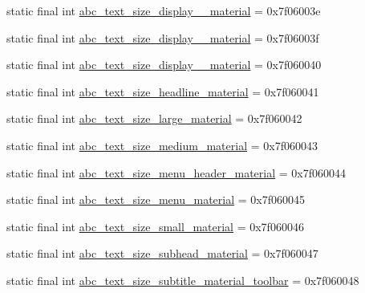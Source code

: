 \begin{DoxyCompactItemize}
\item 
static final int \mbox{\hyperlink{classandroid_1_1support_1_1v7_1_1appcompat_1_1_r_1_1dimen_a7b93df89a088e5eb5c60634410dd3025}{abc\+\_\+text\+\_\+size\+\_\+display\+\_\+\_\+material}} = 0x7f06003e
\item 
static final int \mbox{\hyperlink{classandroid_1_1support_1_1v7_1_1appcompat_1_1_r_1_1dimen_ae98219f74eec556bfe8abdeab1d68bba}{abc\+\_\+text\+\_\+size\+\_\+display\+\_\+\_\+material}} = 0x7f06003f
\item 
static final int \mbox{\hyperlink{classandroid_1_1support_1_1v7_1_1appcompat_1_1_r_1_1dimen_a195f9cd8beddae6abfe3c046563048f4}{abc\+\_\+text\+\_\+size\+\_\+display\+\_\+\_\+material}} = 0x7f060040
\item 
static final int \mbox{\hyperlink{classandroid_1_1support_1_1v7_1_1appcompat_1_1_r_1_1dimen_a2a101ceeddd746cea87f31d3de5aa4a5}{abc\+\_\+text\+\_\+size\+\_\+headline\+\_\+material}} = 0x7f060041
\item 
static final int \mbox{\hyperlink{classandroid_1_1support_1_1v7_1_1appcompat_1_1_r_1_1dimen_aedc89ce2b273642f5480bd48d7c166b7}{abc\+\_\+text\+\_\+size\+\_\+large\+\_\+material}} = 0x7f060042
\item 
static final int \mbox{\hyperlink{classandroid_1_1support_1_1v7_1_1appcompat_1_1_r_1_1dimen_a76406ab43a5bb455ca77ef738ae916e8}{abc\+\_\+text\+\_\+size\+\_\+medium\+\_\+material}} = 0x7f060043
\item 
static final int \mbox{\hyperlink{classandroid_1_1support_1_1v7_1_1appcompat_1_1_r_1_1dimen_a5df48e7e501a21c3eb6555a97c883f3a}{abc\+\_\+text\+\_\+size\+\_\+menu\+\_\+header\+\_\+material}} = 0x7f060044
\item 
static final int \mbox{\hyperlink{classandroid_1_1support_1_1v7_1_1appcompat_1_1_r_1_1dimen_a013dbf6cc3ed277e44042ef75aac53a0}{abc\+\_\+text\+\_\+size\+\_\+menu\+\_\+material}} = 0x7f060045
\item 
static final int \mbox{\hyperlink{classandroid_1_1support_1_1v7_1_1appcompat_1_1_r_1_1dimen_ada53ec83d3d0880e3b4c1f120c5c7907}{abc\+\_\+text\+\_\+size\+\_\+small\+\_\+material}} = 0x7f060046
\item 
static final int \mbox{\hyperlink{classandroid_1_1support_1_1v7_1_1appcompat_1_1_r_1_1dimen_a53289079c21fcd186a4164e9b2f2da99}{abc\+\_\+text\+\_\+size\+\_\+subhead\+\_\+material}} = 0x7f060047
\item 
static final int \mbox{\hyperlink{classandroid_1_1support_1_1v7_1_1appcompat_1_1_r_1_1dimen_a5bf6baa53b8c1682126087a919610d01}{abc\+\_\+text\+\_\+size\+\_\+subtitle\+\_\+material\+\_\+toolbar}} = 0x7f060048

\end{DoxyCompactItemize}

